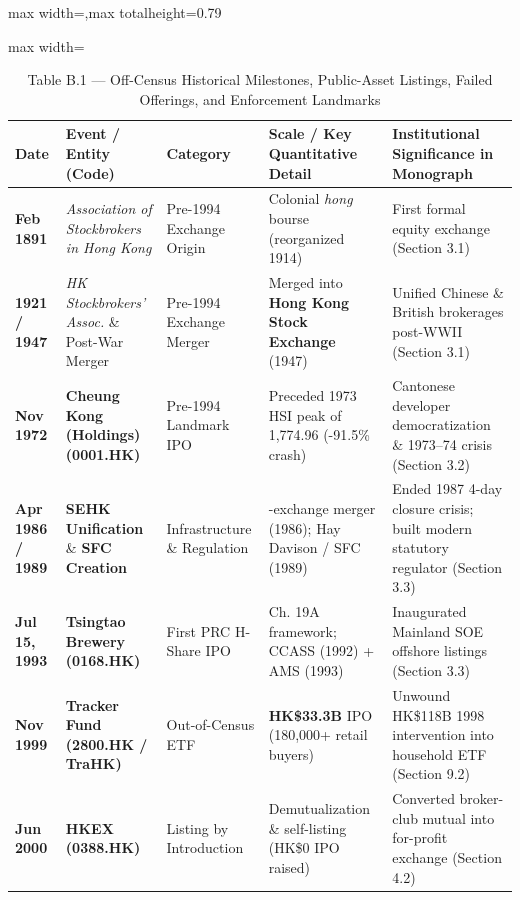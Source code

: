 \documentclass[11pt,letterpaper]{article}
\begin{document}
\begin{table}[!htbp]
\centering
\caption*{Table B.1 — Off-Census Historical Milestones, Public-Asset Listings, Failed Offerings, and Enforcement Landmarks}
\begin{adjustbox}{max width=\textwidth,max totalheight=0.79\textheight}
\begin{minipage}{\textwidth}\centering
\footnotesize
\setlength{\tabcolsep}{3.5pt}
\renewcommand{\arraystretch}{1.18}
\begin{adjustbox}{max width=\textwidth}
\begin{tabular}{l>{\raggedright\arraybackslash}p{3.33cm}>{\raggedright\arraybackslash}p{2.60cm}>{\raggedright\arraybackslash}p{4.28cm}>{\raggedright\arraybackslash}p{4.28cm}}
\toprule
Date & Event / Entity (Code) & Category & Scale / Key Quantitative Detail & Institutional Significance in Monograph \\
\midrule
\textbf{Feb 1891} & \textit{Association of Stockbrokers in Hong Kong} & Pre-1994 Exchange Origin & Colonial \textit{hong} bourse (reorganized 1914) & First formal equity exchange (Section 3.1) \\
\textbf{1921 / 1947} & \textit{HK Stockbrokers’ Assoc.} \& Post-War Merger & Pre-1994 Exchange Merger & Merged into \textbf{Hong Kong Stock Exchange} (1947) & Unified Chinese \& British brokerages post-WWII (Section 3.1) \\
\textbf{Nov 1972} & \textbf{Cheung Kong (Holdings) (0001.HK)} & Pre-1994 Landmark IPO & Preceded 1973 HSI peak of 1,774.96 (-91.5\% crash) & Cantonese developer democratization \& 1973–74 crisis (Section 3.2) \\
\textbf{Apr 1986 / 1989} & \textbf{SEHK Unification} \& \textbf{SFC Creation} & Infrastructure \& Regulation & 4-exchange merger (1986); Hay Davison / SFC (1989) & Ended 1987 4-day closure crisis; built modern statutory regulator (Section 3.3) \\
\textbf{Jul 15, 1993} & \textbf{Tsingtao Brewery (0168.HK)} & First PRC H-Share IPO & Ch. 19A framework; CCASS (1992) + AMS (1993) & Inaugurated Mainland SOE offshore listings (Section 3.3) \\
\textbf{Nov 1999} & \textbf{Tracker Fund (2800.HK / TraHK)} & Out-of-Census ETF & \textbf{HK\$33.3B} IPO (180,000+ retail buyers) & Unwound HK\$118B 1998 intervention into household ETF (Section 9.2) \\
\textbf{Jun 2000} & \textbf{HKEX (0388.HK)} & Listing by Introduction & Demutualization \& self-listing (HK\$0 IPO raised) & Converted broker-club mutual into for-profit exchange (Section 4.2) \\

\end{tabular}
\end{adjustbox}
\end{minipage}
\end{adjustbox}
\end{table}
\end{document}

